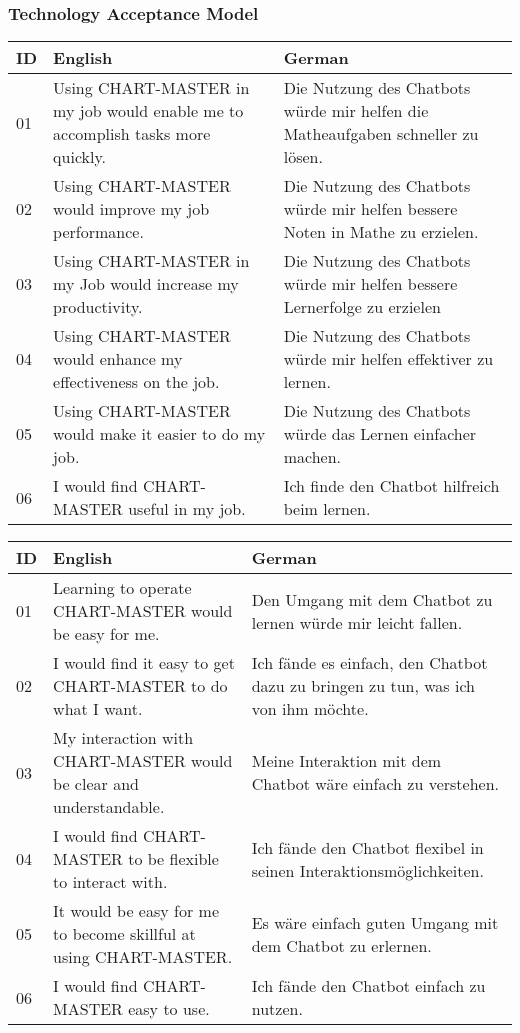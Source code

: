 \subsubsection*{Technology Acceptance Model}

\begingroup
\setlength{\tabcolsep}{12pt}
\renewcommand{\arraystretch}{1.5}

\begin{table}[ht]
\begin{tabularx}{\textwidth}{l|X|X}
    \textbf{ID} & \textbf{English} & \textbf{German} \\
    \hline
    01 & Using CHART-MASTER in my job would enable me to accomplish tasks more quickly. & Die Nutzung des Chatbots würde mir helfen die Matheaufgaben schneller zu lösen. \\
    02 & Using CHART-MASTER would improve my job performance. & Die Nutzung des Chatbots würde mir helfen bessere Noten in Mathe zu erzielen. \\
    03 & Using CHART-MASTER in my Job would increase my productivity. & Die Nutzung des Chatbots würde mir helfen bessere Lernerfolge zu erzielen \\
    04 & Using CHART-MASTER would enhance my effectiveness on the job. & Die Nutzung des Chatbots würde mir helfen effektiver zu lernen. \\
    05 & Using CHART-MASTER would make it easier to do my job. & Die Nutzung des Chatbots würde das Lernen einfacher machen. \\
    06 & I would find CHART-MASTER useful in my job. & Ich finde den Chatbot hilfreich beim lernen. \\
\end{tabularx}
\end{table}

\begin{table}[ht]
\begin{tabularx}{\textwidth}{l|X|X}
    \textbf{ID} & \textbf{English} & \textbf{German} \\
    \hline
    01 & Learning to operate CHART-MASTER would be easy for me. & Den Umgang mit dem Chatbot zu lernen würde mir leicht fallen. \\
    02 & I would find it easy to get CHART-MASTER to do what I want. & Ich fände es einfach, den Chatbot dazu zu bringen zu tun, was ich von ihm möchte. \\
    03 & My interaction with CHART-MASTER would be clear and understandable. & Meine Interaktion mit dem Chatbot wäre einfach zu verstehen. \\
    04 & I would find CHART-MASTER to be flexible to interact with. & Ich fände den Chatbot flexibel in seinen Interaktionsmöglichkeiten. \\
    05 & It would be easy for me to become skillful at using CHART-MASTER. & Es wäre einfach guten Umgang mit dem Chatbot zu erlernen. \\
    06 & I would find CHART-MASTER easy to use. & Ich fände den Chatbot einfach zu nutzen. \\
\end{tabularx}
\end{table}

